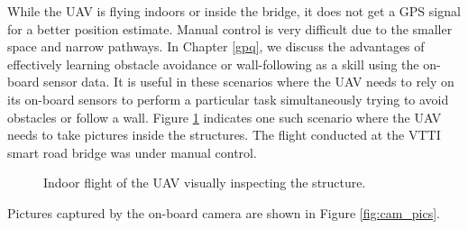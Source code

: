\documentclass[12pt]{report}
\begin{document}
While the UAV is flying indoors or inside the bridge, it does not get a GPS signal for a better position estimate. Manual control is very difficult due to the smaller space and narrow pathways. In Chapter \ref{gpq}, we discuss the advantages of effectively learning obstacle avoidance or wall-following as a skill using the on-board sensor data. It is useful in these scenarios where the UAV needs to rely on its on-board sensors to perform a particular task simultaneously trying to avoid obstacles or follow a wall. Figure \ref{fig:indoor_flight} indicates one such scenario where the UAV needs to take pictures inside the structures. The flight conducted at the VTTI smart road bridge was under manual control. \par 
\begin{figure}[htp]
	\centering 
	\caption{Indoor flight of the UAV visually inspecting the structure.}
   \label{fig:indoor_flight}
\end{figure}

Pictures captured by the on-board camera are shown in Figure \ref{fig:cam_pics}.
\end{document}
